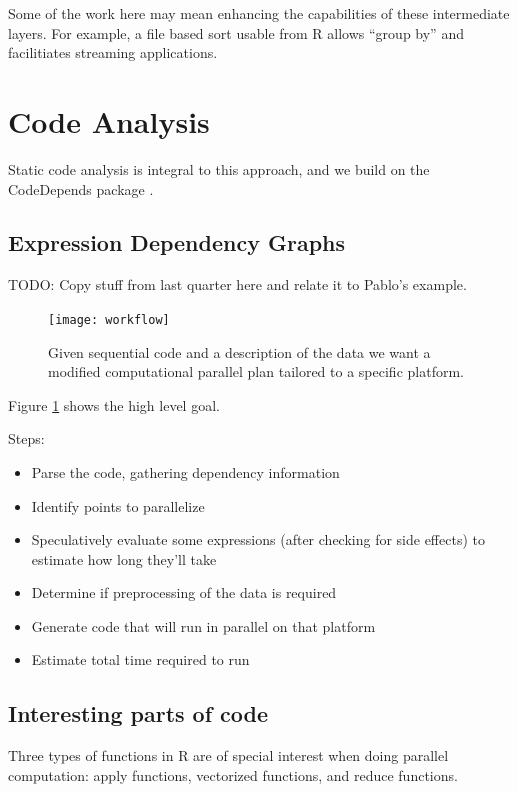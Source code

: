\documentclass[12pt]{article}
\begin{document}
Some of the work here may mean enhancing the capabilities of these
intermediate layers. For example, a file based sort usable from R allows
``group by'' and facilitiates streaming applications.

\section{Code Analysis}

Static code analysis is integral to this approach, and we build on the 
CodeDepends package \cite{R-CodeDepends}.

\subsection{Expression Dependency Graphs}

TODO: Copy stuff from last quarter here and relate it to Pablo's example.

\begin{figure}
\centering
\texttt{[image: workflow]}
\caption{Given sequential code and a description of the data we want
    a modified computational parallel plan tailored to a specific platform.}
\label{fig:workflow}
\end{figure}

Figure \ref{fig:workflow} shows the high level goal.

Steps:

\begin{itemize}
    \item Parse the code, gathering dependency information
    \item Identify points to parallelize
    \item Speculatively evaluate some expressions (after checking for side
        effects) to estimate how long they'll
        take
    \item Determine if preprocessing of the data is required
    \item Generate code that will run in parallel on that platform
    \item Estimate total time required to run
\end{itemize}

\subsection{Interesting parts of code}

Three types of functions in R are of special interest when doing parallel
computation: apply functions, vectorized
functions, and reduce functions.
\end{document}
